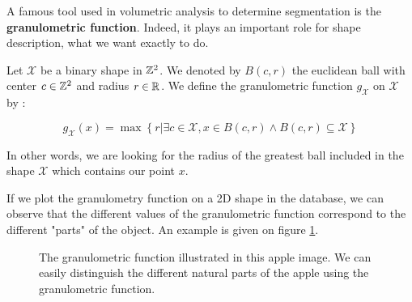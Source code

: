 A famous tool used in volumetric analysis to determine segmentation is the \textbf{granulometric function}. Indeed, it plays an important role for shape description, what we want exactly to do.

\begin{defi}
Let $\mathcal{X}$ be a binary shape in $\mathbb{Z}^{2}$. We denoted by $B(c,r)$ the euclidean ball with center $c \in \mathbb{Z}^{2}$ and radius $r \in \mathbb{R}$. We define the granulometric function $g_{\mathcal{X}}$ on $\mathcal{X}$ by :

$$ g_{\mathcal{X}}(x) = \operatorname{max} \left\{ r | \exists c \in \mathcal{X}, x \in B(c,r) \wedge B(c,r) \subseteq \mathcal{X} \right\} $$ 
\end{defi}

In other words, we are looking for the radius of the greatest ball included in the shape $\mathcal{X}$ which contains our point $x$.

If we plot the granulometry function on a 2D shape in the database, we can observe that the different values of the granulometric function correspond to the different "parts" of the object. An example is given on figure \ref{apple-granulo}.

\begin{figure}[!ht]
    \centering
    \qquad\qquad\qquad
    \caption{The granulometric function illustrated in this apple image. We can easily distinguish the different natural parts of the apple using the granulometric function.}
    \label{apple-granulo}
\end{figure}

